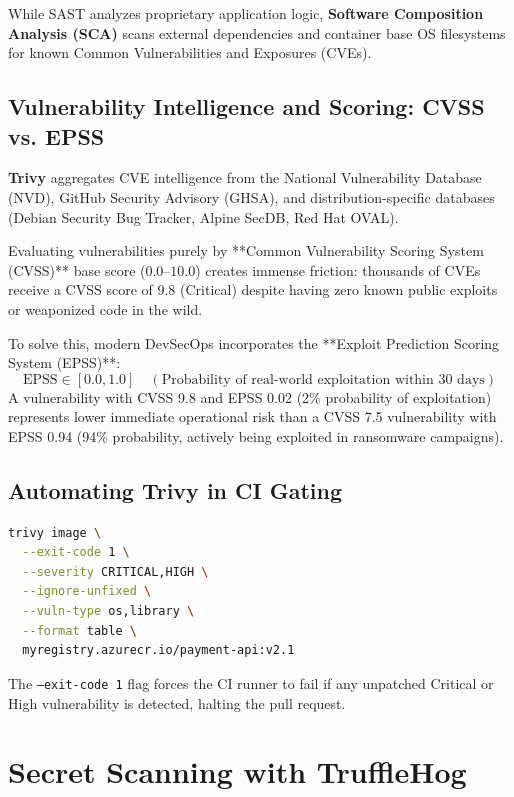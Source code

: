 While SAST analyzes proprietary application logic, \textbf{Software Composition Analysis (SCA)} scans external dependencies and container base OS filesystems for known Common Vulnerabilities and Exposures (CVEs).

\subsection{Vulnerability Intelligence and Scoring: CVSS vs. EPSS}
\textbf{Trivy} aggregates CVE intelligence from the National Vulnerability Database (NVD), GitHub Security Advisory (GHSA), and distribution-specific databases (Debian Security Bug Tracker, Alpine SecDB, Red Hat OVAL).

Evaluating vulnerabilities purely by **Common Vulnerability Scoring System (CVSS)** base score ($0.0$--$10.0$) creates immense friction: thousands of CVEs receive a CVSS score of 9.8 (Critical) despite having zero known public exploits or weaponized code in the wild.

To solve this, modern DevSecOps incorporates the **Exploit Prediction Scoring System (EPSS)**:
\begin{equation}
\text{EPSS} \in [0.0, 1.0] \quad (\text{Probability of real-world exploitation within 30 days})
\end{equation}
A vulnerability with CVSS 9.8 and EPSS 0.02 (2\% probability of exploitation) represents lower immediate operational risk than a CVSS 7.5 vulnerability with EPSS 0.94 (94\% probability, actively being exploited in ransomware campaigns).

\subsection{Automating Trivy in CI Gating}
\begin{lstlisting}[language=bash, caption={Trivy Container Scan with Strict Failure Gating}]
trivy image \
  --exit-code 1 \
  --severity CRITICAL,HIGH \
  --ignore-unfixed \
  --vuln-type os,library \
  --format table \
  myregistry.azurecr.io/payment-api:v2.1
\end{lstlisting}
The \texttt{--exit-code 1} flag forces the CI runner to fail if any unpatched Critical or High vulnerability is detected, halting the pull request.

\section{Secret Scanning with TruffleHog}


